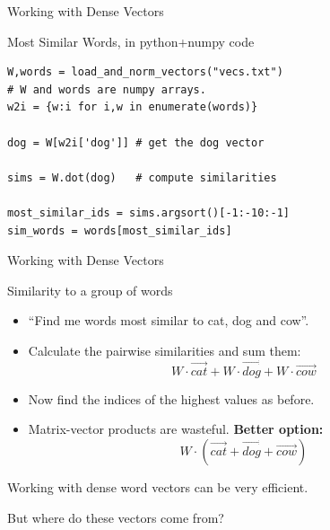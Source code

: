 \documentclass[compress]{beamer}
\begin{document}
\begin{frame}[fragile]{Working with Dense Vectors}
    \begin{block}{Most Similar Words, in python+numpy code}
   \begin{verbatim}
W,words = load_and_norm_vectors("vecs.txt")
# W and words are numpy arrays.
w2i = {w:i for i,w in enumerate(words)}

dog = W[w2i['dog']] # get the dog vector

sims = W.dot(dog)   # compute similarities

most_similar_ids = sims.argsort()[-1:-10:-1]
sim_words = words[most_similar_ids]
   \end{verbatim}
   \end{block}
\end{frame}

\begin{frame}[fragile]{Working with Dense Vectors}
    \begin{block}{Similarity to a group of words}
        \begin{itemize}
            \item ``Find me words most similar to cat, dog and cow''.
            \item Calculate the pairwise similarities and sum them:
                \[W \cdot \vec{cat} + W \cdot \vec{dog} + W \cdot \vec{cow} \]
            \item Now find the indices of the highest values as before.
                \pause
        \end{itemize}
        \begin{itemize}
            \item Matrix-vector products are wasteful. \textbf{Better option:}
                \[W \cdot (\vec{cat} + \vec{dog} + \vec{cow}) \]
        \end{itemize}
    \end{block}
\end{frame}

\begin{frame}{}

    \centering
    Working with dense word vectors can be very efficient.

    \vspace{2em}

    \pause
    But where do these vectors come from?

\end{frame}
\end{document}
